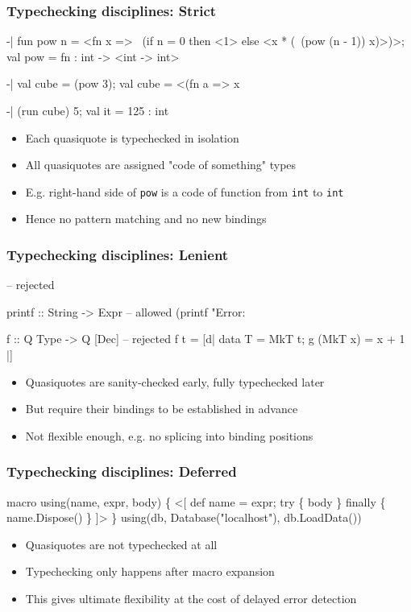 \documentclass[hyperref={bookmarks=false}]{beamer}
\begin{document}
\begin{frame}[fragile]
\frametitle{Typechecking disciplines: Strict}
\begin{semiverbatim}
-| fun pow n = <fn x =>
    ~(if n = 0 then <1> else <x * (~(pow (n - 1)) x)>)>;
val pow = fn : int -> <int -> int>

-| val cube = (pow 3);
val cube = <(fn a => x %

-| (run cube) 5;
val it = 125 : int

\end{semiverbatim}

\begin{itemize}
\item Each quasiquote is typechecked in isolation
\item All quasiquotes are assigned "code of something" types
\item E.g. right-hand side of \texttt{pow} is a code of function from \texttt{int} to \texttt{int}
\item Hence no pattern matching and no new bindings
\end{itemize}
\end{frame}

\begin{frame}[fragile]
\frametitle{Typechecking disciplines: Lenient}
\begin{semiverbatim}
[| 'a' + True |] -- rejected

printf :: String -> Expr -- allowed
{\textdollar}(printf "Error: %

f :: Q Type -> Q [Dec] -- rejected
f t = [d| data T = MkT {\textdollar}t; g (MkT x) = x + 1 |]

\end{semiverbatim}

\begin{itemize}
\item Quasiquotes are sanity-checked early, fully typechecked later
\item But require their bindings to be established in advance
\item Not flexible enough, e.g. no splicing into binding positions
\end{itemize}
\end{frame}

\begin{frame}[fragile]
\frametitle{Typechecking disciplines: Deferred}
\begin{semiverbatim}
macro using(name, expr, body) \{
  <[
    def {\textdollar}name = {\textdollar}expr;
    try \{ {\textdollar}body \} finally \{ {\textdollar}name.Dispose() \}
  ]>
\}
using(db, Database("localhost"), db.LoadData())

\end{semiverbatim}

\begin{itemize}
\item Quasiquotes are not typechecked at all
\item Typechecking only happens after macro expansion
\item This gives ultimate flexibility at the cost of delayed error detection
\end{itemize}
\end{frame}
\end{document}
